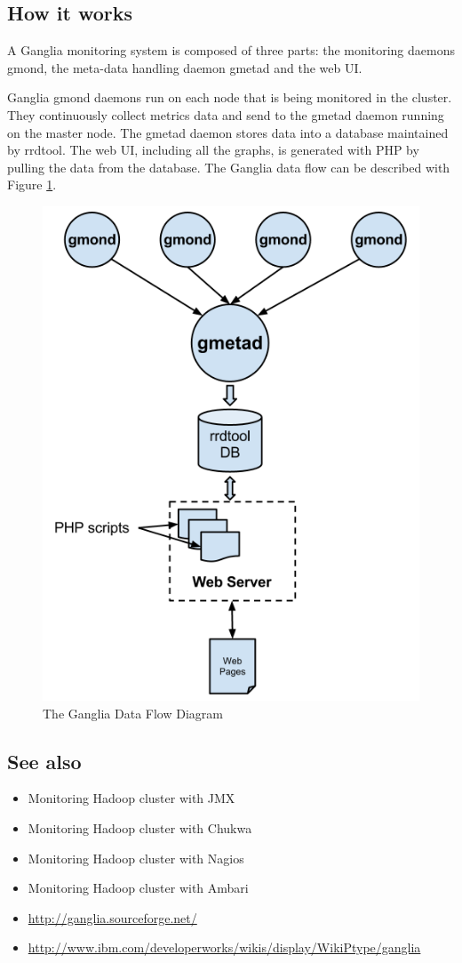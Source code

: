 \subsection*{How it works}
A Ganglia monitoring system is composed of three parts: the monitoring daemons gmond, the meta-data handling daemon gmetad and the web UI.

Ganglia gmond daemons run on each node that is being monitored in the cluster. They continuously collect metrics data and send to the gmetad daemon running on the master node. The gmetad daemon stores data into a database maintained by rrdtool. The web UI, including all the graphs, is generated with PHP by pulling the data from the database. The Ganglia data flow can be described with Figure \ref{fig:ganglia.dataflow}.
\begin{figure}[ht]
  \centering
  \includegraphics[width=.6\textwidth]{figs/5163os_06_13.png}
  \caption{The Ganglia Data Flow Diagram}\label{fig:ganglia.dataflow}
\end{figure} 
\subsection*{See also}
\begin{itemize}
  \item Monitoring Hadoop cluster with JMX
  \item Monitoring Hadoop cluster with Chukwa
  \item Monitoring Hadoop cluster with Nagios
  \item Monitoring Hadoop cluster with Ambari
  \item \url{http://ganglia.sourceforge.net/}
  \item \url{http://www.ibm.com/developerworks/wikis/display/WikiPtype/ganglia}
\end{itemize}
